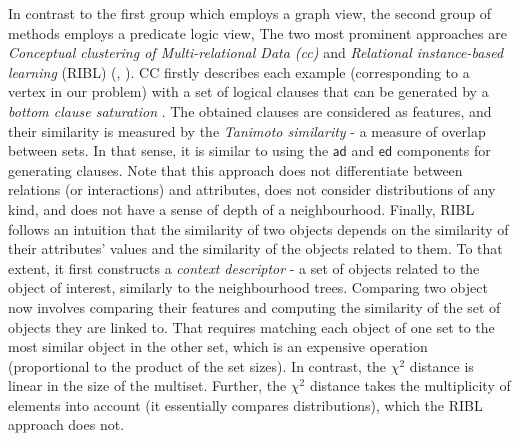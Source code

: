 In contrast to the first group which employs a graph view, the second group of methods employs a predicate logic view, 
The two most prominent approaches are \textit{Conceptual clustering of Multi-relational Data (\gls{cc})} \cite{Fonseca2012} and \textit{Relational instance-based learning} (RIBL) (\cite{RIBL96}, \cite{Kirsten98relationaldistance-based}).
CC firstly describes each example (corresponding to a vertex in our problem) with a set of logical clauses that can be generated by a \textit{bottom clause saturation} \cite{CamachoFRC07}. 
The obtained clauses are considered as features, and their similarity is measured by  the \textit{Tanimoto similarity} - a measure of overlap between sets.
In that sense, it is similar to using the $\mathsf{ad}$ and $\mathsf{ed}$ components for generating clauses.
Note that this approach does not differentiate between relations (or interactions) and attributes, does not consider distributions of any kind, and does not have a sense of depth of a neighbourhood.
Finally, RIBL follows an intuition that the similarity  of two objects depends on the similarity of their attributes' values and the similarity of the objects related to them.
To that extent, it first constructs a \textit{context descriptor} - a set of objects related to the object of interest, similarly to the neighbourhood trees.
Comparing two object now involves comparing their features and computing the similarity of the set of objects they are linked to.
That requires matching each object of one set to the most similar object in the other set, which is an expensive operation (proportional to the product of the set sizes). 
In contrast, the $\chi^2$ distance is linear in the size of the multiset. 
Further, the $\chi^2$ distance takes the multiplicity of elements into account (it essentially compares distributions), which the RIBL approach does not.



